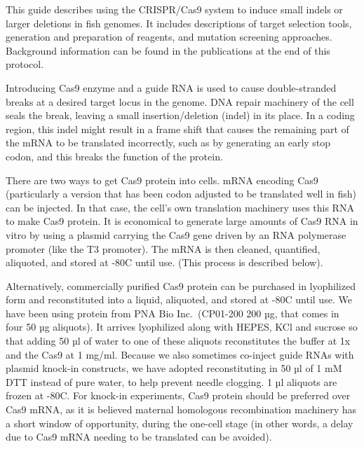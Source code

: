 \documentclass[
  letterpaper,
  DIV=11,
  numbers=noendperiod]{scrreprt}
\begin{document}
\begin{tcolorbox}[enhanced jigsaw, rightrule=.15mm, title=\textcolor{quarto-callout-note-color}{\faInfo}\hspace{0.5em}{CRISPR/Cas9 Technology}, titlerule=0mm, opacitybacktitle=0.6, toprule=.15mm, bottomrule=.15mm, opacityback=0, left=2mm, colframe=quarto-callout-note-color-frame, breakable, coltitle=black, colback=white, colbacktitle=quarto-callout-note-color!10!white, bottomtitle=1mm, leftrule=.75mm, toptitle=1mm, arc=.35mm]

This guide describes using the CRISPR/Cas9 system to induce small indels
or larger deletions in fish genomes. It includes descriptions of target
selection tools, generation and preparation of reagents, and mutation
screening approaches. Background information can be found in the
publications at the end of this protocol.

Introducing Cas9 enzyme and a guide RNA is used to cause double-stranded
breaks at a desired target locus in the genome. DNA repair machinery of
the cell seals the break, leaving a small insertion/deletion (indel) in
its place. In a coding region, this indel might result in a frame shift
that causes the remaining part of the mRNA to be translated incorrectly,
such as by generating an early stop codon, and this breaks the function
of the protein.

There are two ways to get Cas9 protein into cells. mRNA encoding Cas9
(particularly a version that has been codon adjusted to be translated
well in fish) can be injected. In that case, the cell's own translation
machinery uses this RNA to make Cas9 protein. It is economical to
generate large amounts of Cas9 RNA in vitro by using a plasmid carrying
the Cas9 gene driven by an RNA polymerase promoter (like the T3
promoter). The mRNA is then cleaned, quantified, aliquoted, and stored
at -80C until use. (This process is described below).

Alternatively, commercially purified Cas9 protein can be purchased in
lyophilized form and reconstituted into a liquid, aliquoted, and stored
at -80C until use. We have been using protein from PNA Bio
Inc.~(CP01-200 200 µg, that comes in four 50 µg aliquots). It arrives
lyophilized along with HEPES, KCl and sucrose so that adding 50 µl of
water to one of these aliquots reconstitutes the buffer at 1x and the
Cas9 at 1 mg/ml. Because we also sometimes co-inject guide RNAs with
plasmid knock-in constructs, we have adopted reconstituting in 50 µl of
1 mM DTT instead of pure water, to help prevent needle clogging. 1 µl
aliquots are frozen at -80C. For knock-in experiments, Cas9 protein
should be preferred over Cas9 mRNA, as it is believed maternal
homologous recombination machinery has a short window of opportunity,
during the one-cell stage (in other words, a delay due to Cas9 mRNA
needing to be translated can be avoided).

\end{tcolorbox}
\end{document}
